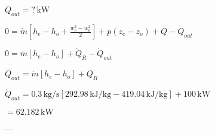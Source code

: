 \( \dot{Q}_{out} = ? \, \text{kW} \)  

\( 0 = \dot{m} \left[ h_e - h_o + \frac{w_e^2 - w_o^2}{2} \right] + p \left( z_e - z_o \right) + Q - \dot{Q}_{out} \)  

\( 0 = \dot{m} \left[ h_e - h_o \right] + \dot{Q}_R - \dot{Q}_{out} \)  

\( \dot{Q}_{out} = \dot{m} \left[ h_e - h_o \right] + \dot{Q}_R \)  

\( \dot{Q}_{out} = 0.3 \, \text{kg/s} \left[ 292.98 \, \text{kJ/kg} - 419.04 \, \text{kJ/kg} \right] + 100 \, \text{kW} \)  

\( = 62.182 \, \text{kW} \)  

---